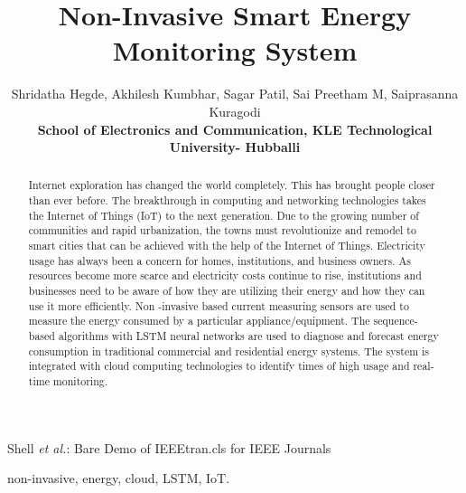 \documentclass[journal]{IEEEtran}
\begin{document}
\title{Non-Invasive Smart Energy Monitoring System}


\author{Shridatha Hegde, 
        Akhilesh Kumbhar,
        Sagar Patil,
        Sai Preetham M,
        Saiprasanna Kuragodi 
        {\newline \begin{center}
            \textbf{School of Electronics and Communication, KLE Technological University- Hubballi}
        \end{center}}}%

{Shell \MakeLowercase{\textit{et al.}}: Bare Demo of IEEEtran.cls for IEEE Journals}

\maketitle

\begin{abstract}
Internet exploration has changed the world completely. This has brought people closer than ever before. The breakthrough in computing and networking technologies takes the Internet of Things (IoT) to the next generation. Due to the growing number of communities and rapid
urbanization, the towns must revolutionize and remodel to smart cities that can be achieved with the help of the Internet of Things. Electricity usage has always been a concern for homes, institutions, and business owners. As resources become more scarce and electricity costs continue to rise, institutions and businesses need to be aware of how they are utilizing their energy and how they can use it more efficiently. Non -invasive based current measuring sensors are used to measure the energy consumed by a particular appliance/equipment. The sequence-based algorithms with LSTM neural networks are used to diagnose and forecast energy consumption in traditional commercial and residential energy systems. The system is integrated with cloud computing technologies to identify times of high usage and real-time monitoring.
\end{abstract}

\begin{IEEEkeywords}
non-invasive, energy, cloud, LSTM, IoT.
\end{IEEEkeywords}
\end{document}
